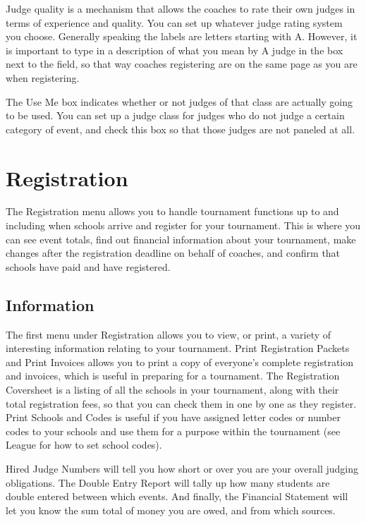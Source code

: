 \documentclass[12pt]{report} \usepackage {fullpage} \usepackage{times}
\begin{document}
Judge quality is a mechanism that allows the coaches to rate their own
judges in terms of experience and quality.  You can set up whatever judge
rating system you choose.  Generally speaking the labels are letters
starting with A.  However, it is important to type in a description of what
you mean by A judge in the box next to the field, so that way coaches
registering are on the same page as you are when registering.

The Use Me box indicates whether or not judges of that class are actually
going to be used.   You can set up a judge class for judges who do not
judge a certain category of event, and check this box so that those judges
are not paneled at all.

\chapter{Registration}

The Registration menu allows you to handle tournament functions up to and
including when schools arrive and register for your tournament.   This is
where you can see event totals, find out financial information about your
tournament, make changes after the registration deadline on behalf of
coaches, and confirm that schools have paid and have registered.


\section{Information}

The first menu under Registration allows you to view, or print, a variety
of interesting information relating to your tournament.     Print
Registration Packets and Print Invoices allows you to print a copy of
everyone's complete registration and invoices, which is useful in preparing
for a tournament.     The Registration Coversheet is a listing of all the
schools in your tournament, along with their total registration fees, so
that you can check them in one by one as they register.     Print Schools
and Codes is useful if you have assigned letter codes or number codes to
your schools and use them for a purpose within the tournament (see League
for how to set school codes).  

Hired Judge Numbers will tell you how short or over you are your overall
judging obligations.    The Double Entry Report will tally up how many
students are double entered between which events.  And finally, the
Financial Statement will let you know the sum total of money you are owed,
and from which sources.
\end{document}

